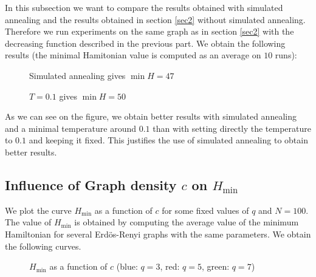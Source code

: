 \documentclass[a4paper]{article}
\begin{document}
In this subsection we want to compare the results obtained with simulated annealing and the results obtained in section \ref{sec2} without simulated annealing. Therefore we run experiments on the same graph as in section \ref{sec2} with the decreasing function described in the previous part. We obtain the following results (the minimal Hamitonian value is computed as an average on $10$ runs):

\begin{figure}[H]
 \begin{minipage}[b]{.45\linewidth}
  \centering{}
  \caption{Simulated annealing gives $\min H=47$ \label{sim}}
 \end{minipage} \hfill
 \begin{minipage}[b]{.45\linewidth}
  \centering{}
  \caption{$T=0.1$ gives $\min H=50$ \label{fix01bis}}
 \end{minipage}
\end{figure}


As we can see on the figure, we obtain better results with simulated annealing and a minimal temperature around $0.1$ than with setting directly the temperature to $0.1$ and keeping it fixed. This justifies the use of simulated annealing to obtain better results.

\subsection{Influence of Graph density $c$ on $H_{\min}$}

We plot the curve $H_{\min}$ as a function of $c$ for some fixed values of $q$ and $N=100$. The value of $H_{\min}$ is obtained by computing the average value of the minimum Hamiltonian for several Erdös-Renyi graphs with the same parameters. We obtain the following curves.

\begin{figure}[H]
 \begin{minipage}[b]{\linewidth}
  \centering{}
  \caption{$H_{\min}$ as a function of $c$ (blue: $q=3$, red: $q=5$, green: $q=7$) \label{hmin}}
 \end{minipage}
\end{figure}
\end{document}
